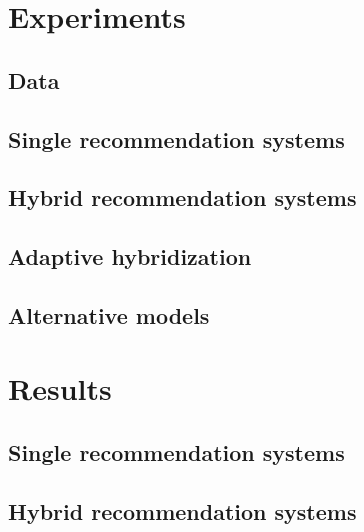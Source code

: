 \documentclass[10pt]{reportMaster}
\begin{document}
\chapter{Experiments}

\section{Data}

\section{Single recommendation systems}

\section{Hybrid recommendation systems}

\section{Adaptive hybridization}

\section{Alternative models}







\chapter{Results}

\section{Single recommendation systems}

\section{Hybrid recommendation systems}
\end{document}
